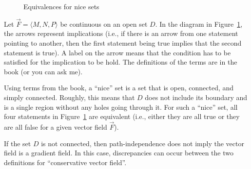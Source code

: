 \begin{figure}[t]
  \centering
  \caption{Equivalences for nice sets}
  \label{fig:equivalences}
\end{figure}


Let $\vec F=\langle M,N,P\rangle$ be continuous on an open set $D$.
In the diagram in Figure~\ref{fig:equivalences}, the arrows represent
implications (i.e., if there is an arrow from one statement pointing
to another, then the first statement being true implies that the
second statement is true).  A label on the arrow means that the
condition has to be satisfied for the implication to be hold.  The
definitions of the terms are in the book (or you can ask me).



Using terms from the book, a ``nice'' set is a set that is open,
connected, and simply connected.  Roughly, this means that $D$ does
not include its boundary and is a single region without any holes going
through it.  For such a ``nice'' set, all four statements in
Figure~\ref{fig:equivalences} are equivalent (i.e., either they are
all true or they are all false for a given vector field $\vec F$).

If the set $D$ is not connected, then path-independence does not imply
the vector field is a gradient field.  In this case, discrepancies can
occur between the two definitions for ``conservative vector field''.

